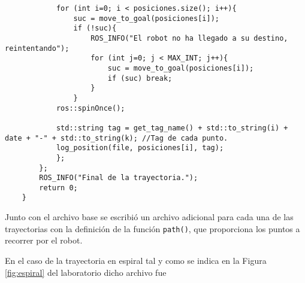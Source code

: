 \begin{lstlisting}
            for (int i=0; i < posiciones.size(); i++){
                suc = move_to_goal(posiciones[i]);
                if (!suc){
                    ROS_INFO("El robot no ha llegado a su destino, reintentando");
                    for (int j=0; j < MAX_INT; j++){
                        suc = move_to_goal(posiciones[i]);
                        if (suc) break;
                    }
                }
            ros::spinOnce();
    
            std::string tag = get_tag_name() + std::to_string(i) + date + "-" + std::to_string(k); //Tag de cada punto.
            log_position(file, posiciones[i], tag);
            };
        };
        ROS_INFO("Final de la trayectoria.");
        return 0;
    }

\end{lstlisting}
\vspace*{0.5cm}

Junto con el archivo base se escribió un archivo adicional para cada una de las trayectorias con la definición de la función \texttt{path()}, que proporciona los puntos a recorrer por el robot.

En el caso de la trayectoria en espiral tal y como se indica en la Figura \ref{fig:espiral} del laboratorio dicho archivo fue

